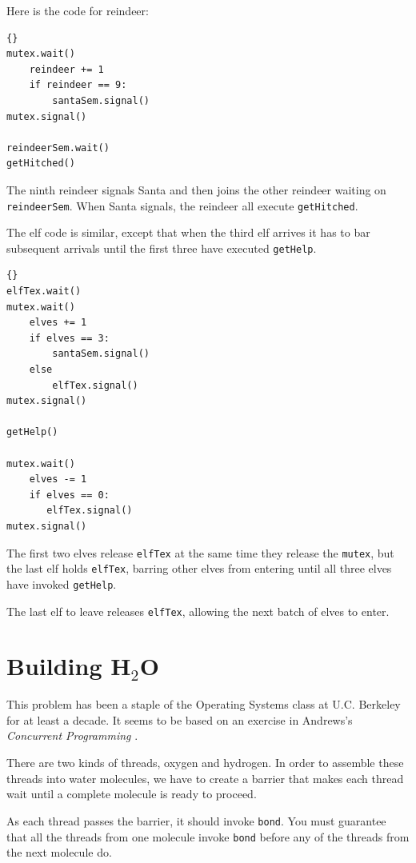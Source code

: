 \documentclass{book}
\begin{document}
Here is the code for reindeer:

\begin{lstlisting}[caption={Santa problem solution (reindeer)}]{}
mutex.wait()
    reindeer += 1
    if reindeer == 9:
        santaSem.signal()
mutex.signal()

reindeerSem.wait()
getHitched()
\end{lstlisting}

The ninth reindeer signals Santa and then joins the other
reindeer waiting on {\tt reindeerSem}.  When Santa signals, the
reindeer all execute {\tt getHitched}.

The elf code is similar, except that when the third elf arrives
it has to bar subsequent arrivals until the first three have
executed {\tt getHelp}.

\newpage
\begin{lstlisting}[caption={Santa problem solution (elves)}]{}
elfTex.wait()
mutex.wait()
    elves += 1
    if elves == 3:
        santaSem.signal()
    else
        elfTex.signal()
mutex.signal()

getHelp()

mutex.wait()
    elves -= 1
    if elves == 0:
       elfTex.signal()
mutex.signal()
\end{lstlisting}

The first two elves release {\tt elfTex} at the same time they release
the {\tt mutex}, but the last elf holds {\tt elfTex}, barring other
elves from entering until all three elves have invoked {\tt getHelp}.

The last elf to leave releases {\tt elfTex}, allowing the
next batch of elves to enter.

\newpage
\section{Building H$_2$O}
\label{water}

This problem has been a staple of the Operating Systems class
at U.C. Berkeley for at least a decade.  It seems to be based on
an exercise in Andrews's {\em Concurrent Programming} \cite{andrews}.

There are two kinds of threads, oxygen and hydrogen.  In order
to assemble these threads into water molecules, we have to
create a barrier that makes each thread wait until a
complete molecule is ready to proceed.

As each thread passes the barrier, it should invoke
{\tt bond}.  You must guarantee that all the threads
from one molecule invoke {\tt bond} before any of the threads
from the next molecule do.
\end{document}

